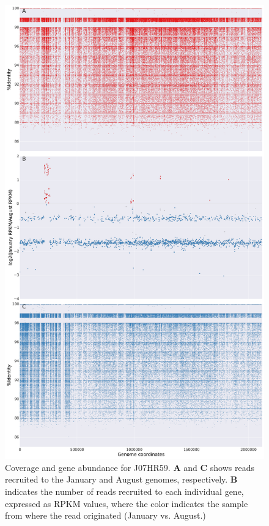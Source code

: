 \begin{figure}[!hbtp]
  \centering
  \includegraphics[width=\textwidth,height=0.8\textheight,keepaspectratio]{Chapter5/Figures/coverage_plots/J07HR59_coverage.pdf}
  \caption{Coverage and gene abundance for J07HR59. \textbf{A} and \textbf{C} shows reads recruited to the January and August genomes, respectively. \textbf{B} indicates the number of reads recruited to each individual gene, expressed as RPKM values, where the color indicates the sample from where the read originated (January vs. August.)}
  \label{J07HR59coverage}
\end{figure}

